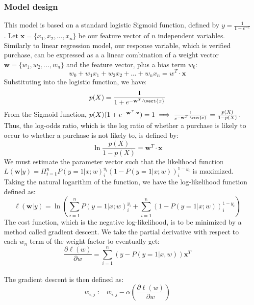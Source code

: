 \documentclass[reqno]{article}
\renewcommand{\vec}[1]{\mathbf{#1}}
\theoremstyle{definition}
\theoremstyle{definition}
\theoremstyle{remark}
\begin{document}
\subsubsection{Model design}
This model is based on a standard logistic Sigmoid function, defined by $y = \frac{1}{1+e^{-x}}$. Let $\vec{x} = \{x_1, x_2, ..., x_n\}$ be our feature vector of $n$ independent variables. Similarly to linear regression model, our response variable, which is verified purchase, can be expressed as a a linear combination of a weight vector $\vec{w} = \{w_1, w_2, ..., w_n\}$ and the feature vector, plus a bias term $w_0$: $$w_0 + w_1x_1 + w_2x_2+...+w_nx_n = w^{T} \cdot \vec{x}$$
Substituting into the logistic function, we have: $$p(X) = \frac{1}{1+e^{-\vec{w}^{T} \cdot \vect{x}}}$$ 
From the Sigmoid function, $p(X)(1+e^{-\vec{w}^{T} \cdot \vec{x}}) = 1 \implies  \frac{1}{e^{-\vec{w}^{T} \cdot \vect{x}}} = \frac{p(X)}{1-p(X)}$. Thus, the log-odds ratio, which is the log ratio of whether a purchase is likely to occur to whether a purchase is not likely to, is defined by: $$\ln \frac{p(X)}{1-p(X)}=\vec{w}^{T} \cdot \vec{x}$$
We must estimate the parameter vector such that the likelihood function $L(\vec{w}|y) = \Pi_{i=1}^n P(y=1|x;w)^{y_i}_{i} (1-P(y=1|x;w))^{1-y_i}_i$ is maximized. Taking the natural logarithm of the function, we have the log-likelihood function defined as: $$\ell(\vec{w}|y) = \ln (\sum_{i=1}^n P(y=1|x;w)^{y_i}_i + \sum_{i=1}^n(1-P(y=1|x;w))^{1-y_i}_i)$$
The cost function, which is the negative log-likelihood, is to be minimized by a method called gradient descent. We take the partial derivative with respect to each $w_n$ term of the weight factor to eventually get:
$$\frac{\partial \ell(w)}{\partial w} = \sum_{i=1}^{n}(y - P(y=1|x,w))\vec{x}^T$$\\
The gradient descent is then defined as: $$w_{i,j} := w_{i,j}-\alpha(\frac{\partial \ell(w)}{\partial w})$$
\end{document}
